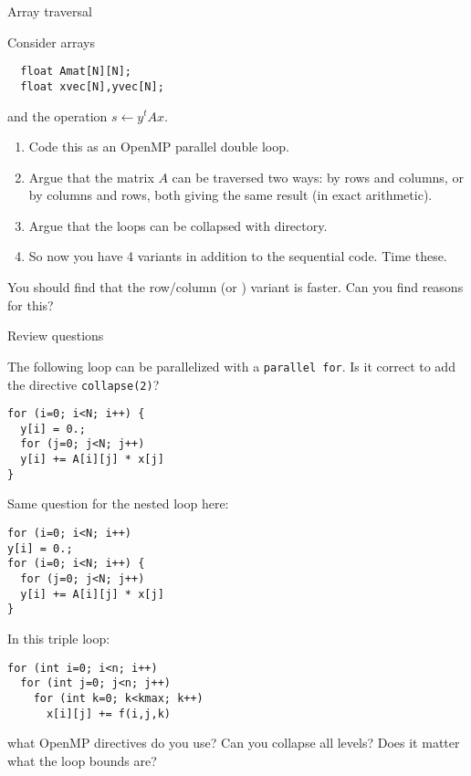  {Array traversal}
\label{sec:omp-row-col-major}

Consider arrays 
\begin{lstlisting}
  float Amat[N][N];
  float xvec[N],yvec[N];  
\end{lstlisting}
and the operation $s\leftarrow y^tAx$.

\begin{enumerate}
\item Code this as an OpenMP parallel double loop.
\item Argue that the matrix $A$ can be traversed two ways:
  by rows and columns, or by columns and rows, both
  giving the same result (in exact arithmetic).
\item Argue that the loops can be collapsed with 
  directory.
\item So now you have 4 variants in addition to the sequential code.
  Time these.
\end{enumerate}

You should find that the row/column (or ) variant
is faster. Can you find reasons for this?

 {Review questions}

\begin{exercise}
  The following loop can be parallelized with a \lstinline+parallel for+.
  Is it correct to add the directive \lstinline+collapse(2)+?

\begin{lstlisting}
for (i=0; i<N; i++) {
  y[i] = 0.;
  for (j=0; j<N; j++)
  y[i] += A[i][j] * x[j]
}
\end{lstlisting}
\end{exercise}

\begin{exercise}
  Same question for the nested loop here:

\begin{lstlisting}
for (i=0; i<N; i++)
y[i] = 0.;
for (i=0; i<N; i++) {
  for (j=0; j<N; j++)
  y[i] += A[i][j] * x[j]
}
\end{lstlisting}
\end{exercise}

\begin{exercise}
  In this triple loop:
\begin{lstlisting}
for (int i=0; i<n; i++)
  for (int j=0; j<n; j++)
    for (int k=0; k<kmax; k++)
      x[i][j] += f(i,j,k)
\end{lstlisting}
what OpenMP directives do you use?
Can you collapse all levels?
Does it matter what the loop bounds are?
\end{exercise}
